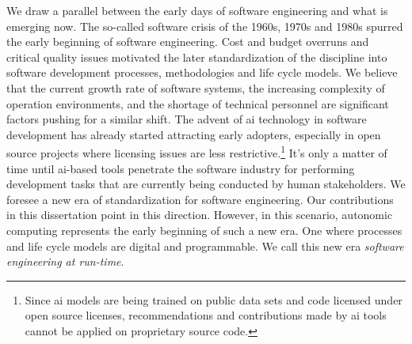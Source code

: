 We draw a parallel between the early days of software engineering and what is emerging now. The so-called software crisis of the 1960s, 1970s and 1980s spurred the early beginning of software engineering. Cost and budget overruns and critical quality issues motivated the later standardization of the discipline into software development processes, methodologies and life cycle models. We believe that the current growth rate of software systems, the increasing complexity of operation environments, and the shortage of technical personnel are significant factors pushing for a similar shift. The advent of \gls{ai} technology in software development has already started attracting early adopters, especially in open source projects where licensing issues are less restrictive.\footnote{Since \gls{ai} models are being trained on public data sets and code licensed under open source licenses, recommendations and contributions made by \gls{ai} tools cannot be applied on proprietary source code.} It's only a matter of time until \gls{ai}-based tools penetrate the software industry for performing development tasks that are currently being conducted by human stakeholders. We foresee a new era of standardization for software engineering. Our contributions in this dissertation point in this direction. However, in this scenario, autonomic computing represents the early beginning of such a new era. One where processes and life cycle models are digital and programmable. We call this new era \emph{software engineering at run-time}.




